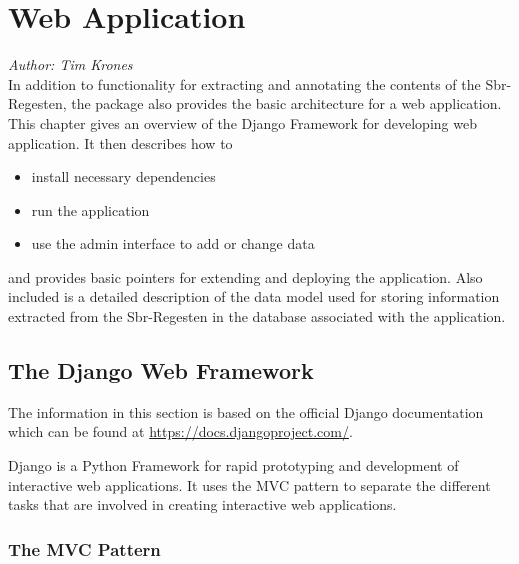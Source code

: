 \section{Web Application}

\emph{Author: Tim Krones} \\

In addition to functionality for extracting and annotating the
contents of the Sbr-Regesten, the package also provides the basic
architecture for a web application. This chapter gives an overview of
the Django Framework for developing web application. It then describes
how to

\begin{itemize}
\item install necessary dependencies
\item run the application
\item use the admin interface to add or change data
\end{itemize}

and provides basic pointers for extending and deploying the
application. Also included is a detailed description of the data model
used for storing information extracted from the Sbr-Regesten in the
database associated with the application.

\subsection{The Django Web Framework}
\label{sec:django}

The information in this section is based on the official Django
documentation which can be found at
\url{https://docs.djangoproject.com/}.

Django is a Python Framework for rapid prototyping and development of
interactive web applications. It uses the MVC pattern to separate the
different tasks that are involved in creating interactive web
applications.

\subsubsection{The MVC Pattern}
\label{sec:mvc}

